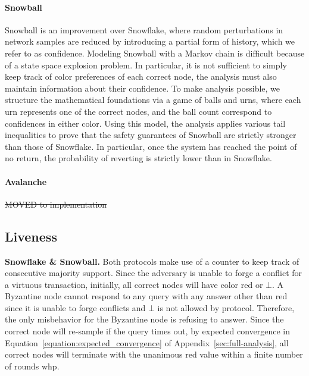 \documentclass[letterpaper,twocolumn,10pt]{article}
\newcommand{\tronly}[2]{#1}
\newcommand{\editremove}[1]{{\color{red}\sout{#1}}}
\theoremstyle{definition}
\begin{document}
\paragraph{Snowball}
Snowball is an improvement over Snowflake, where random perturbations in network samples are reduced by introducing a partial form of history, which we refer to as confidence. 
Modeling Snowball with a Markov chain is difficult because of a state space explosion problem. In particular, it is not sufficient to simply keep track of color preferences of each correct node, the analysis must also maintain information about their confidence. 
To make analysis possible, we structure the mathematical foundations via a game of balls and urns, where each urn represents one of the correct nodes, and the ball count correspond to confidences in either color. 
Using this model, the analysis applies various tail inequalities to prove that the safety guarantees of Snowball are strictly stronger than those of Snowflake. In particular, once the system has reached the point of no return, the probability of reverting is strictly lower than in Snowflake. 

\paragraph{Avalanche}
\editremove{%
MOVED to implementation}

\subsection{Liveness}\tronly{}{\vspace{-0.5em}}

\noindent\textbf{Snowflake \& Snowball.}
Both protocols make use of a counter to keep track of consecutive majority support. Since the adversary is unable to forge
a conflict for a virtuous transaction, initially,
all correct nodes will have color red or
$\bot$. A Byzantine node cannot respond to any query with any answer
other than red since it is unable to forge conflicts and $\bot$ is not allowed by protocol. Therefore, the only misbehavior for the Byzantine node is refusing to answer. Since the correct node will re-sample if the query times out, by expected convergence in \tronly{Equation~\ref{equation:expected_convergence}}{\cite{avalanche}} of Appendix~\ref{sec:full-analysis},
 all correct nodes will terminate with the unanimous red value within a finite number of rounds whp.
\end{document}
